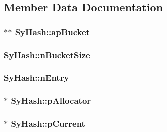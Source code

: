 \subsection{Member Data Documentation}
\hypertarget{struct_sy_hash_ad7565044e8b62b8413c3c6e38161f7ff}{
\subsubsection[{ap\-Bucket}]{$\ast$$\ast$ Sy\-Hash\-::ap\-Bucket}}\label{d9/da7/struct_sy_hash_ad7565044e8b62b8413c3c6e38161f7ff}
\hypertarget{struct_sy_hash_a908d68d3af13b8a642c4d945ef94142f}{
\subsubsection[{n\-Bucket\-Size}]{ Sy\-Hash\-::n\-Bucket\-Size}}\label{d9/da7/struct_sy_hash_a908d68d3af13b8a642c4d945ef94142f}
\hypertarget{struct_sy_hash_a63df6ff0ce020df28b31ff6b98ab34b6}{
\subsubsection[{n\-Entry}]{ Sy\-Hash\-::n\-Entry}}\label{d9/da7/struct_sy_hash_a63df6ff0ce020df28b31ff6b98ab34b6}
\hypertarget{struct_sy_hash_a458f6f84f685c225fee71e17c351370a}{
\subsubsection[{p\-Allocator}]{$\ast$ Sy\-Hash\-::p\-Allocator}}\label{d9/da7/struct_sy_hash_a458f6f84f685c225fee71e17c351370a}
\hypertarget{struct_sy_hash_a86c520ee78f024f7d2280e0a9f7a34cd}{
\subsubsection[{p\-Current}]{ $\ast$ Sy\-Hash\-::p\-Current}}\label{d9/da7/struct_sy_hash_a86c520ee78f024f7d2280e0a9f7a34cd}
